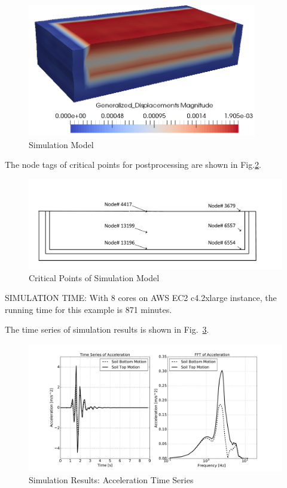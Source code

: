 \begin{figure}[H]
  \centering
  \includegraphics[width = 10cm]{./Figure-files/nonlinear_analysis_steps/free_field_3D/motion3D_DRM3D_free_field.png}
  \caption{Simulation Model}
  \label{fig_nonlinear_steps_D_motion_3D_model_results_free_field}
\end{figure}


The node tags of critical points for postprocessing are shown in Fig.\ref{fig_points_soil_foundation}.

\begin{figure}[H]
  \centering
  \includegraphics[width = 12cm]{./Figure-files/nonlinear_analysis_steps/free_field_3D/free_field_3D_node_location.pdf}
  \caption{Critical Points of Simulation Model}
  \label{fig_points_soil_foundation}
\end{figure}

SIMULATION TIME: With 8 cores on AWS EC2 c4.2xlarge instance, the running time for this example is 871 minutes.


The time series of simulation results is shown in Fig.~\ref{fig_decon_3D_motion_1D_model_results_top_bottom_time_series_fr3d}.
\begin{figure}[H]
  \centering
  \includegraphics[width = 15cm]{./Figure-files/nonlinear_analysis_steps/free_field_3D/DRM3D_motion_node_4454_x_acce_compare.pdf}
  \caption{Simulation Results: Acceleration Time Series }
  \label{fig_decon_3D_motion_1D_model_results_top_bottom_time_series_fr3d}
\end{figure}

